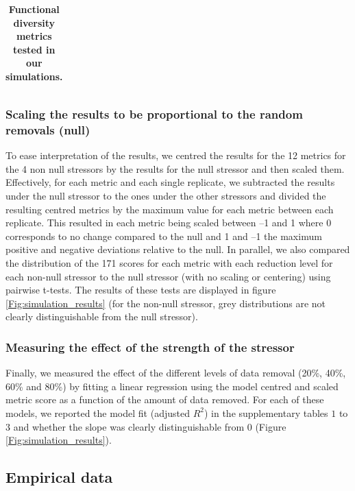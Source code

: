 \documentclass[12pt,letterpaper]{article}
\begin{document}
\begin{table}
\begin{tabular}{p{0.1\linewidth}|p{0.15\linewidth}|p{0.15\linewidth}|p{0.2\linewidth}|p{0.15\linewidth}|p{0.1\linewidth}}
\end{tabular}
\caption{\scriptsize{\textbf{Functional diversity metrics tested in our simulations.}}
}
\label{Tab:metrics}
\end{table}

\subsubsection{Scaling the results to be proportional to the random removals (null)}

To ease interpretation of the results, we centred the results for the 12 metrics for the 4 non null stressors by the results for the null stressor and then scaled them.
Effectively, for each metric and each single replicate, we subtracted the results under the null stressor to the ones under the other stressors and divided the resulting centred metrics by the maximum value for each metric between each replicate.
This resulted in each metric being scaled between –1 and 1 where 0 corresponds to no change compared to the null and 1 and –1 the maximum positive and negative deviations relative to the null.
In parallel, we also compared the distribution of the 171 scores for each metric with each reduction level for each non-null stressor to the null stressor (with no scaling or centering) using pairwise t-tests.
The results of these tests are displayed in figure \ref{Fig:simulation_results} (for the non-null stressor, grey distributions are not clearly distinguishable from the null stressor).

\subsubsection{Measuring the effect of the strength of the stressor}

Finally, we measured the effect of the different levels of data removal (20\%, 40\%, 60\% and 80\%) by fitting a linear regression using the model centred and scaled metric score as a function of the amount of data removed.
For each of these models, we reported the model fit (adjusted $R^2$) in the supplementary tables $1$ to $3$ and whether the slope was clearly distinguishable from $0$ (Figure \ref{Fig:simulation_results}).

\subsection{Empirical data}
\end{document}
